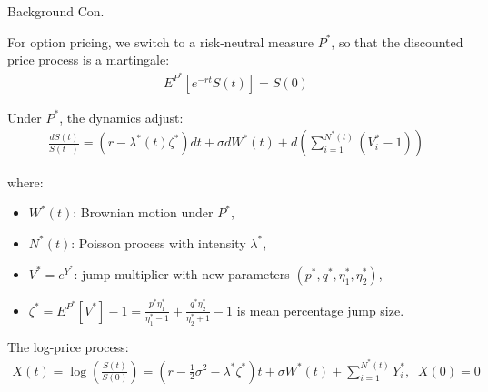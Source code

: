 \documentclass{beamer}
\begin{document}
\begin{frame}{Background Con.}

    {\footnotesize \footnotesize
    \par For option pricing, we switch to a risk-neutral measure \( P^* \), so that the discounted price process is a martingale:
    \begin{align*}
        E^{P^*}[e^{-rt}S(t)] = S(0)
    \end{align*}
    \par Under \( P^* \), the dynamics adjust:
    \begin{align*}
        \frac{dS(t)}{S(t^-)} = (r - \lambda^*(t)\zeta^*)dt + \sigma dW^*(t) + d\left(\sum_{i=1}^{N^*(t)}(V_i^*-1)\right)
    \end{align*}
    \par where:
    \begin{itemize}
        \item \( W^*(t) \): Brownian motion under \( P^* \),
        \item \( N^*(t) \): Poisson process with intensity \( \lambda^* \),
        \item \( V^* = e^{Y^*} \): jump multiplier with new parameters \( (p^*, q^*, \eta_1^*, \eta_2^*) \),
        \item \( \zeta^* = E^{P^*}[V^*] - 1 = \frac{p^{*}\eta_{1}^{*}}{\eta_{1}^{*}-1} + \frac{q^{*}\eta_{2}^{*}}{\eta_{2}^{*}+1} - 1\) is mean percentage jump size.
    \end{itemize}
    \par The log-price process:  
    \begin{align*}
        X(t) = \log\left(\frac{S(t)}{S(0)}\right) = \left(r - \frac{1}{2}\sigma^2 - 
    \lambda^*\zeta^*\right)t + \sigma W^*(t) + \sum_{i=1}^{N^*(t)} Y_i^*,\;\;X(0)=0
    \end{align*}
    }
\end{frame}
\end{document}

